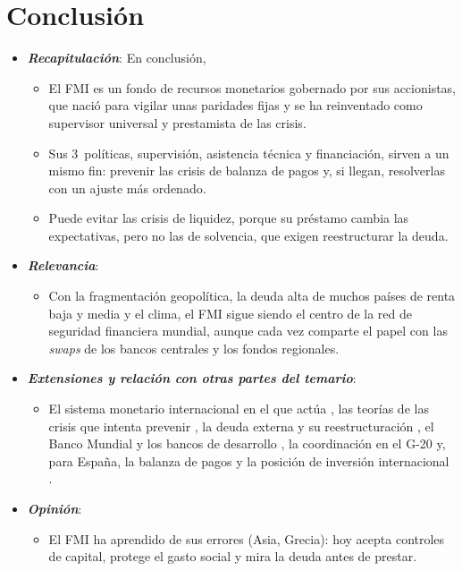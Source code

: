 \documentclass[11pt]{article}
\begin{document}
\section*{Conclusión}

\begin{itemize}
\item \textbf{\emph{Recapitulación}}: En conclusión,
  \begin{itemize}
  \item El FMI es un fondo de recursos monetarios gobernado por sus accionistas, que nació para vigilar unas paridades fijas y se ha reinventado como supervisor universal y prestamista de las crisis.
  \item Sus 3~políticas, supervisión, asistencia técnica y financiación, sirven a un mismo fin: prevenir las crisis de balanza de pagos y, si llegan, resolverlas con un ajuste más ordenado.
  \item Puede evitar las crisis de liquidez, porque su préstamo cambia las expectativas, pero no las de solvencia, que exigen reestructurar la deuda.
  \end{itemize}
\item \textbf{\emph{Relevancia}}:
  \begin{itemize}
  \item Con la fragmentación geopolítica, la deuda alta de muchos países de renta baja y media y el clima, el FMI sigue siendo el centro de la red de seguridad financiera mundial, aunque cada vez comparte el papel con las \emph{swaps} de los bancos centrales y los fondos regionales.
  \end{itemize}
\item \textbf{\emph{Extensiones y relación con otras partes del temario}}:
  \begin{itemize}
  \item El sistema monetario internacional en el que actúa  , las teorías de las crisis que intenta prevenir , la deuda externa y su reestructuración , el Banco Mundial y los bancos de desarrollo , la coordinación en el G-20  y, para España, la balanza de pagos y la posición de inversión internacional .
  \end{itemize}
\item \textbf{\emph{Opinión}}:
  \begin{itemize}
  \item El FMI ha aprendido de sus errores (Asia, Grecia): hoy acepta controles de capital, protege el gasto social y mira la deuda antes de prestar.

\end{itemize}
\end{itemize}
\end{document}
